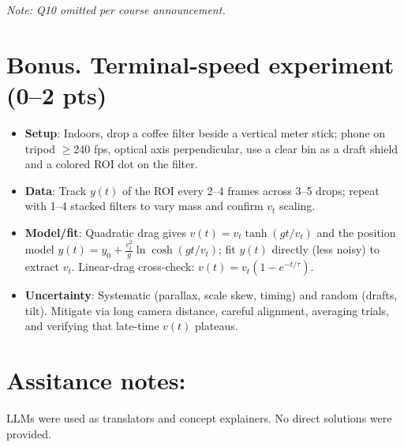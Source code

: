 \documentclass[11pt]{article}
\begin{document}
\noindent\textit{Note: Q10 omitted per course announcement.}

\section*{Bonus. Terminal-speed experiment (0--2 pts)}
\begin{center}
\end{center}

\begin{itemize}
  \item \textbf{Setup}: Indoors, drop a coffee filter beside a vertical meter stick; phone on tripod \(\ge\)240 fps, optical axis perpendicular, use a clear bin as a draft shield and a colored ROI dot on the filter.
  \item \textbf{Data}: Track \(y(t)\) of the ROI every 2--4 frames across 3--5 drops; repeat with 1--4 stacked filters to vary mass and confirm \(v_t\) scaling.
  \item \textbf{Model/fit}: Quadratic drag gives \(v(t)=v_t\tanh( g t/ v_t )\) and the position model \(y(t)=y_0+\tfrac{v_t^2}{g}\ln\!\cosh( g t/ v_t )\); fit \(y(t)\) directly (less noisy) to extract \(v_t\). Linear-drag cross-check: \(v(t)=v_t(1-e^{-t/\tau})\).
  \item \textbf{Uncertainty}: Systematic (parallax, scale skew, timing) and random (drafts, tilt). Mitigate via long camera distance, careful alignment, averaging trials, and verifying that late-time \(v(t)\) plateaus.
\end{itemize}

\section*{Assitance notes:} LLMs were used as translators and concept explainers. No direct solutions were provided.
\end{document}
